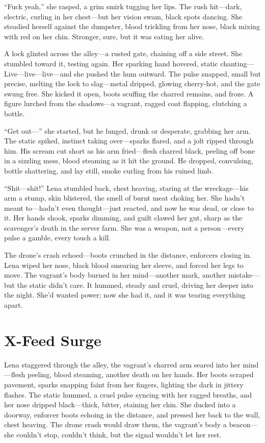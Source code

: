 \documentclass[12pt]{book}
\begin{document}
“Fuck yeah,” she rasped, a grim smirk tugging her lips. The rush hit---dark, electric, curling in her chest---but her vision swam, black spots dancing. She steadied herself against the dumpster, blood trickling from her nose, black mixing with red on her chin. Stronger, sure, but it was eating her alive.

A lock glinted across the alley---a rusted gate, chaining off a side street. She stumbled toward it, testing again. Her sparking hand hovered, static chanting---Live---live---live---and she pushed the hum outward. The pulse snapped, small but precise, melting the lock to slag---metal dripped, glowing cherry-hot, and the gate swung free. She kicked it open, boots scuffing the charred remains, and froze. A figure lurched from the shadows---a vagrant, ragged coat flapping, clutching a bottle.

“Get out---” she started, but he lunged, drunk or desperate, grabbing her arm. The static spiked, instinct taking over---sparks flared, and a jolt ripped through him. His scream cut short as his arm fried---flesh charred black, peeling off bone in a sizzling mess, blood steaming as it hit the ground. He dropped, convulsing, bottle shattering, and lay still, smoke curling from his ruined limb.

“Shit---shit!” Lena stumbled back, chest heaving, staring at the wreckage---his arm a stump, skin blistered, the smell of burnt meat choking her. She hadn’t meant to---hadn’t even thought---just reacted, and now he was dead, or close to it. Her hands shook, sparks dimming, and guilt clawed her gut, sharp as the scavenger’s death in the server farm. She was a weapon, not a person---every pulse a gamble, every touch a kill.

The drone’s crash echoed---boots crunched in the distance, enforcers closing in. Lena wiped her nose, black blood smearing her sleeve, and forced her legs to move. The vagrant’s body burned in her mind---another mark, another mistake---but the static didn’t care. It hummed, steady and cruel, driving her deeper into the night. She’d wanted power; now she had it, and it was tearing everything apart.

\section{X-Feed Surge}

Lena staggered through the alley, the vagrant’s charred arm seared into her mind---flesh peeling, blood steaming, another death on her hands. Her boots scraped pavement, sparks snapping faint from her fingers, lighting the dark in jittery flashes. The static hummed, a cruel pulse syncing with her ragged breaths, and her nose dripped black---thick, bitter, staining her chin. She ducked into a doorway, enforcer boots echoing in the distance, and pressed her back to the wall, chest heaving. The drone crash would draw them, the vagrant’s body a beacon---she couldn’t stop, couldn’t think, but the signal wouldn’t let her rest.
\end{document}
